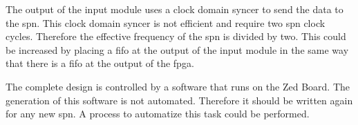 The output of the input module uses a clock domain syncer to send the data to the \gls{spn}. This clock domain syncer is not efficient and require two \gls{spn} clock cycles. Therefore the effective frequency of the \gls{spn} is divided by two. This could be increased by placing a \gls{fifo} at the output of the input module in the same way that there is a \gls{fifo} at the output of the \gls{fpga}.

The complete design is controlled by a software that runs on the Zed Board. The generation of this software is not automated. Therefore it should be written again for any new \gls{spn}. A process to automatize this task could be performed.

